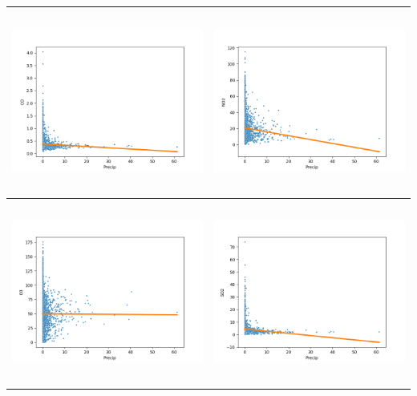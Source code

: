 \documentclass[18pt, letterpaper]{article}
\begin{document}
\begin{table}[H]
\centering
\begin{tabular}{|c|c|}
\hline
\includegraphics[width=80mm,height=60mm]{visualisations/corr_plots/precipxCO_scatter.png}  & \includegraphics[width=80mm,height=60mm]{visualisations/corr_plots/precipxNO2_scatter.png} \\ \hline
\includegraphics[width=80mm,height=60mm]{visualisations/corr_plots/precipxO3_scatter.png}  & \includegraphics[width=80mm,height=60mm]{visualisations/corr_plots/precipxSO2_scatter.png} \\ \hline

\end{tabular}
\end{table}
\end{document}
